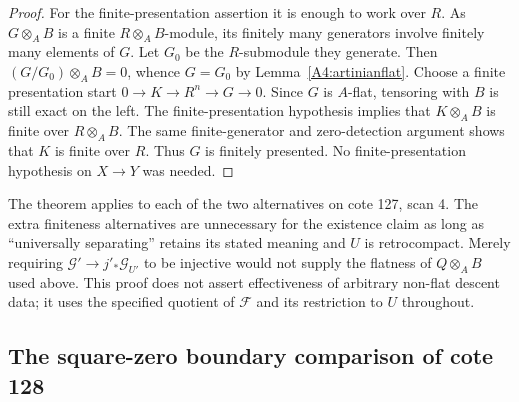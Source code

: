 \begin{proof}
For the finite-presentation assertion it is enough to work over $R$.
As $G\otimes_A B$ is a finite $R\otimes_A B$-module, its finitely many
generators involve finitely many elements of $G$.  Let $G_0$ be the
$R$-submodule they generate.  Then $(G/G_0)\otimes_A B=0$, whence $G=G_0$
by Lemma~\ref{A4:artinianflat}.  Choose a finite presentation start
$0\to K\to R^n\to G\to0$.  Since $G$ is $A$-flat, tensoring with $B$
is still exact on the left.  The finite-presentation hypothesis implies
that $K\otimes_A B$ is finite over $R\otimes_A B$.  The same finite-generator
and zero-detection argument shows that $K$ is finite over $R$.  Thus $G$
is finitely presented.  No finite-presentation hypothesis on $X\to Y$ was
needed.
\end{proof}

\begin{remark}
\label{A4:flatclosure-scope}
The theorem applies to each of the two alternatives on cote 127, scan 4.
The extra finiteness alternatives are unnecessary for the existence claim
as long as ``universally separating'' retains its stated meaning and $U$
is retrocompact.  Merely requiring $\mathcal G'\to j'_*\mathcal G_{U'}$
to be injective would not supply the flatness of $Q\otimes_A B$ used above.
This proof does not assert effectiveness of arbitrary non-flat descent
data; it uses the specified quotient of $\mathcal F$ and its restriction to
$U$ throughout.
\end{remark}

\subsection{The square-zero boundary comparison of cote 128}

